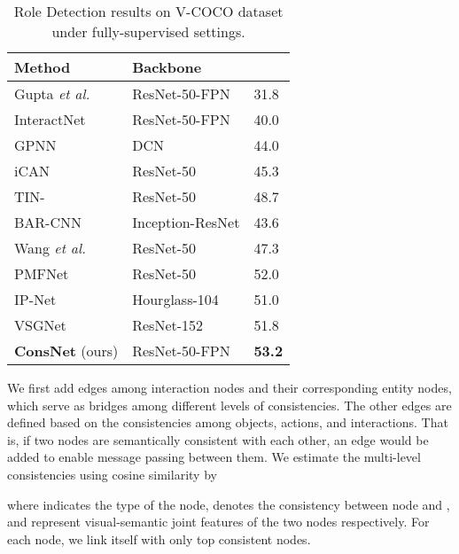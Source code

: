 \documentclass[sigconf,screen]{acmart}
\begin{document}
\begin{table}
\caption{Role Detection results on V-COCO dataset under fully-supervised settings.}
\label{tab:1}
\begin{tabularx}{0.82\linewidth}{p{2.4cm}<{\raggedright}|p{2.4cm}<{\raggedright}|p{1cm}<{\centering}}
\toprule
\textbf{Method}&\textbf{Backbone}&\boldmath{}\\
\midrule
Gupta \textit{et al.} \cite{gupta2015visual}&ResNet-50-FPN&31.8\\
InteractNet \cite{gkioxari2018detecting}&ResNet-50-FPN&40.0\\
GPNN \cite{qi2018learning}&DCN&44.0\\
iCAN \cite{gao2018ican}&ResNet-50&45.3\\
TIN- \cite{li2019transferable}&ResNet-50&48.7\\
BAR-CNN \cite{kolesnikov2019detecting}&Inception-ResNet&43.6\\
Wang \textit{et al.} \cite{wang2019deep}&ResNet-50&47.3\\
PMFNet \cite{wan2019pose}&ResNet-50&52.0\\
IP-Net \cite{wang2020learning}&Hourglass-104&51.0\\
VSGNet \cite{ulutan2020vsgnet}&ResNet-152&51.8\\
\textbf{ConsNet} (ours)&ResNet-50-FPN&\textbf{53.2}\\
\bottomrule
\end{tabularx}
\end{table}

We first add edges among interaction nodes and their corresponding entity nodes, which serve as bridges among different levels of consistencies. The other edges are defined based on the consistencies among objects, actions, and interactions. That is, if two nodes are semantically consistent with each other, an edge would be added to enable message passing between them. We estimate the multi-level consistencies using cosine similarity by

where  indicates the type of the node,  denotes the consistency between node  and ,  and  represent visual-semantic joint features of the two nodes respectively. For each node, we link itself with only top  consistent nodes.
\end{document}
